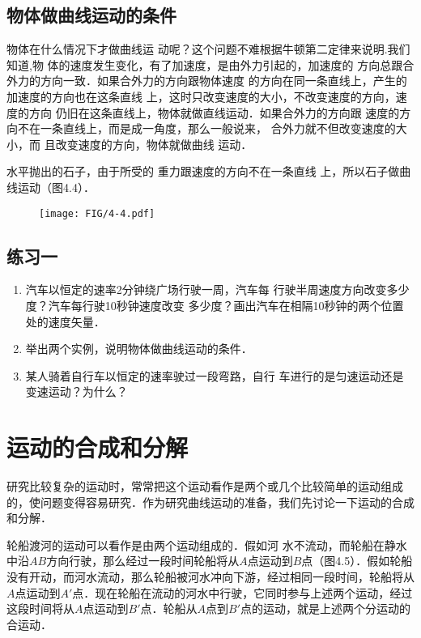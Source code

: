 \subsection{物体做曲线运动的条件}

物体在什么情况下才做曲线运
动呢？这个问题不难根据牛顿第二定律来说明.我们知道,物
体的速度发生变化，有了加速度，是由外力引起的，加速度的
方向总跟合外力的方向一致．如果合外力的方向跟物体速度
的方向在同一条直线上，产生的加速度的方向也在这条直线
上，这时只改变速度的大小，不改变速度的方向，速度的方向
仍旧在这条直线上，物体就做直线运动．如果合外力的方向跟
速度的方向不在一条直线上，而是成一角度，那么一般说来，
合外力就不但改变速度的大小，而
且改变速度的方向，物体就做曲线
运动．

    水平抛出的石子，由于所受的
重力跟速度的方向不在一条直线
上，所以石子做曲线运动（图4.4）．

\begin{figure}[htp]
    \centering
    \texttt{[image: FIG/4-4.pdf]}
    \caption{}
    \end{figure}
 
\subsection*{练习一}
\begin{enumerate}
\item 汽车以恒定的速率2分钟绕广场行驶一周，汽车每
行驶半周速度方向改变多少度？汽车每行驶10秒钟速度改变
多少度？画出汽车在相隔10秒钟的两个位置处的速度矢量．
\item 举出两个实例，说明物体做曲线运动的条件．
\item 某人骑着自行车以恒定的速率驶过一段弯路，自行
车进行的是匀速运动还是变速运动？为什么？
\end{enumerate}


\section{运动的合成和分解}
研究比较复杂的运动时，常常把这个运动看作是两个或几个比较简单的运动组成的，使问题变得容易研究．作为研究曲线运动的准备，我们先讨论一下运动的合成和分解．

轮船渡河的运动可以看作是由两个运动组成的．假如河
水不流动，而轮船在静水中沿$AB$方向行驶，那么经过一段时间轮船将从$A$点运动到$B$点（图4.5）．假如轮船没有开动，而河水流动，那么轮船被河水冲向下游，经过相同一段时间，轮船将从$A$点运动到$A'$点．现在轮船在流动的河水中行驶，它同时参与上述两个运动，经过这段时间将从$A$点运动到$B'$点．轮船从$A$点到$B'$点的运动，就是上述两个分运动的合运动．

